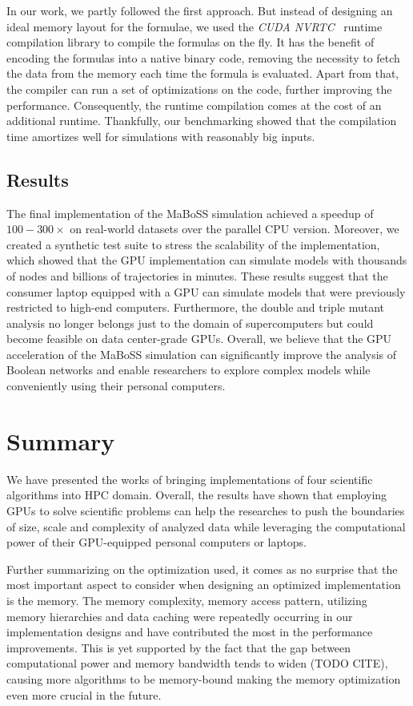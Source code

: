 In our work, we partly followed the first approach. But instead of designing an ideal memory layout for the formulae, we used the \emph{CUDA NVRTC}~\cite{nvrtc-online} runtime compilation library to compile the formulas on the fly. It has the benefit of encoding the formulas into a native binary code, removing the necessity to fetch the data from the memory each time the formula is evaluated. Apart from that, the compiler can run a set of optimizations on the code, further improving the performance. Consequently, the runtime compilation comes at the cost of an additional runtime. Thankfully, our benchmarking showed that the compilation time amortizes well for simulations with reasonably big inputs.

\subsection{Results}

The final implementation of the MaBoSS simulation achieved a speedup of $100-300\times$ on real-world datasets over the parallel CPU version. Moreover, we created a synthetic test suite to stress the scalability of the implementation, which showed that the GPU implementation can simulate models with thousands of nodes and billions of trajectories in minutes. These results suggest that the consumer laptop equipped with a GPU can simulate models that were previously restricted to high-end computers. Furthermore, the double and triple mutant analysis no longer belongs just to the domain of supercomputers but could become feasible on data center-grade GPUs. Overall, we believe that the GPU acceleration of the MaBoSS simulation can significantly improve the analysis of Boolean networks and enable researchers to explore complex models while conveniently using their personal computers.

\section{Summary}

We have presented the works of bringing implementations of four scientific algorithms into HPC domain. Overall, the results have shown that employing GPUs to solve scientific problems can help the researches to push the boundaries of size, scale and complexity of analyzed data while leveraging the computational power of their GPU-equipped personal computers or laptops.

Further summarizing on the optimization used, it comes as no surprise that the most important aspect to consider when designing an optimized implementation is the memory. The memory complexity, memory access pattern, utilizing memory hierarchies and data caching were repeatedly occurring in our implementation designs and have contributed the most in the performance improvements. This is yet supported by the fact that the gap between computational power and memory bandwidth tends to widen (TODO CITE), causing more algorithms to be memory-bound making the memory optimization even more crucial in the future.

